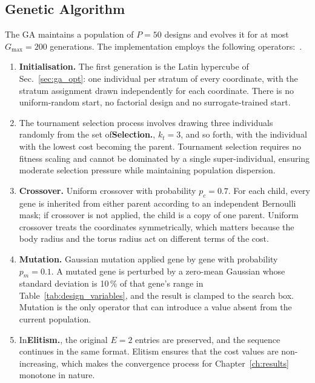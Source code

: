 \subsection{Genetic Algorithm}
\label{sec:ga_operators}

The GA maintains a population of $P = 50$ designs and evolves it for at most $G_{\max} = 200$ generations. The implementation employs the following operators:~\cite{Goldberg1989}.

\begin{enumerate}
    \item \textbf{Initialisation.} The first generation is the Latin hypercube of Sec.~\ref{sec:ga_opt}: one individual per stratum of every coordinate, with the stratum assignment drawn independently for each coordinate. There is no uniform-random start, no factorial design and no surrogate-trained start.

    \item The tournament selection process involves drawing three individuals randomly from the set of\textbf{Selection.}, $k_t = 3$, and so forth, with the individual with the lowest cost becoming the parent. Tournament selection requires no fitness scaling and cannot be dominated by a single super-individual, ensuring moderate selection pressure while maintaining population dispersion.

    \item \textbf{Crossover.} Uniform crossover with probability $p_c = 0.7$. For each child, every gene is inherited from either parent according to an independent Bernoulli mask; if crossover is not applied, the child is a copy of one parent. Uniform crossover treats the coordinates symmetrically, which matters because the body radius and the torus radius act on different terms of the cost.

    \item \textbf{Mutation.} Gaussian mutation applied gene by gene with probability $p_m = 0.1$. A mutated gene is perturbed by a zero-mean Gaussian whose standard deviation is 10\,\% of that gene's range in Table~\ref{tab:design_variables}, and the result is clamped to the search box. Mutation is the only operator that can introduce a value absent from the current population.

    \item In\textbf{Elitism.}, the original $E = 2$ entries are preserved, and the sequence continues in the same format. Elitism ensures that the cost values are non-increasing, which makes the convergence process for Chapter~\ref{ch:results} monotone in nature.
\end{enumerate}

